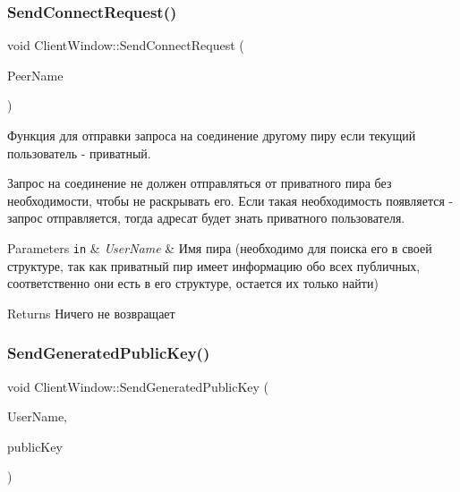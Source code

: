 \subsubsection{\texorpdfstring{Send\+Connect\+Request()}{SendConnectRequest()}}
{\footnotesize\ttfamily void Client\+Window\+::\+Send\+Connect\+Request (\begin{DoxyParamCaption}\item[{const Q\+String \&}]{Peer\+Name }\end{DoxyParamCaption})\hspace{0.3cm}{\ttfamily [private]}}



Функция для отправки запроса на соединение другому пиру если текущий пользователь -\/ приватный. 

Запрос на соединение не должен отправляться от приватного пира без необходимости, чтобы не раскрывать его. Если такая необходимость появляется -\/ запрос отправляется, тогда адресат будет знать приватного пользователя. 
\begin{DoxyParams}[1]{Parameters}
\mbox{\tt in}  & {\em User\+Name} & Имя пира (необходимо для поиска его в своей структуре, так как приватный пир имеет информацию обо всех публичных, соответственно они есть в его структуре, остается их только найти) \\
\hline
\end{DoxyParams}
\begin{DoxyReturn}{Returns}
Ничего не возвращает 
\end{DoxyReturn}
\mbox{\label{class_client_window_a64b8023ab0edf40ea745b667039846e6}} 
\subsubsection{\texorpdfstring{Send\+Generated\+Public\+Key()}{SendGeneratedPublicKey()}}
{\footnotesize\ttfamily void Client\+Window\+::\+Send\+Generated\+Public\+Key (\begin{DoxyParamCaption}\item[{const Q\+String \&}]{User\+Name,  }\item[{Crypto\+P\+P\+::\+Sec\+Byte\+Block}]{public\+Key }\end{DoxyParamCaption})\hspace{0.3cm}{\ttfamily [private]}}



